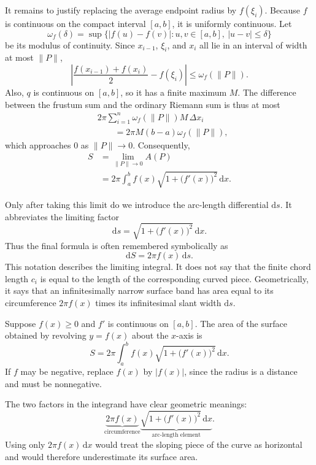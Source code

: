 It remains to justify replacing the average endpoint radius by
\(f(\xi_i)\).  Because \(f\) is continuous on the compact interval
\([a,b]\), it is uniformly continuous.  Let
\[
    \omega_f(\delta)
    =\sup\{\lvert f(u)-f(v)\rvert:
            u,v\in[a,b],\ \lvert u-v\rvert\leq\delta\}
\]
be its modulus of continuity.  Since \(x_{i-1}\), \(\xi_i\), and \(x_i\)
all lie in an interval of width at most \(\lVert P\rVert\),
\[
    \left\lvert
        \frac{f(x_{i-1})+f(x_i)}{2}-f(\xi_i)
    \right\rvert
    \leq\omega_f(\lVert P\rVert).
\]
Also, \(q\) is continuous on \([a,b]\), so it has a finite maximum \(M\).
The difference between the frustum sum and the ordinary Riemann sum is thus
at most
\begin{align*}
    &2\pi\sum_{i=1}^n
      \omega_f(\lVert P\rVert)M\,\Delta x_i \\
    &\qquad=2\pi M(b-a)\omega_f(\lVert P\rVert),
\end{align*}
which approaches \(0\) as \(\lVert P\rVert\to0\).  Consequently,
\begin{align*}
    S
    &=\lim_{\lVert P\rVert\to0}A(P) \\
    &=2\pi\int_a^b
      f(x)\sqrt{1+\bigl(f'(x)\bigr)^2}\,\mathrm{d}x.
\end{align*}

Only after taking this limit do we introduce the arc-length differential
\(\mathrm{d}s\).  It abbreviates the limiting factor
\[
    \mathrm{d}s
    =\sqrt{1+\bigl(f'(x)\bigr)^2}\,\mathrm{d}x.
\]
Thus the final formula is often remembered symbolically as
\[
    \mathrm{d}S=2\pi f(x)\,\mathrm{d}s.
\]
This notation describes the limiting integral.  It does not say that the
finite chord length \(c_i\) is equal to the length of the corresponding
curved piece.  Geometrically, it says that an infinitesimally narrow surface
band has area equal to its circumference \(2\pi f(x)\) times its
infinitesimal slant width \(\mathrm{d}s\).

\begin{theorem}
    Suppose \(f(x)\geq0\) and \(f'\) is continuous on \([a,b]\).  The area
    of the surface obtained by revolving \(y=f(x)\) about the \(x\)-axis is
    \[
        S=2\pi\int_a^b
        f(x)\sqrt{1+\bigl(f'(x)\bigr)^2}\,\mathrm{d}x.
    \]
    If \(f\) may be negative, replace \(f(x)\) by \(\lvert f(x)\rvert\),
    since the radius is a distance and must be nonnegative.
\end{theorem}

The two factors in the integrand have clear geometric meanings:
\[
    \underbrace{2\pi f(x)}_{\text{circumference}}
    \underbrace{\sqrt{1+\bigl(f'(x)\bigr)^2}\,\mathrm{d}x}
                _{\text{arc-length element}}.
\]
Using only \(2\pi f(x)\,\mathrm{d}x\) would treat the sloping piece of the
curve as horizontal and would therefore underestimate its surface area.

